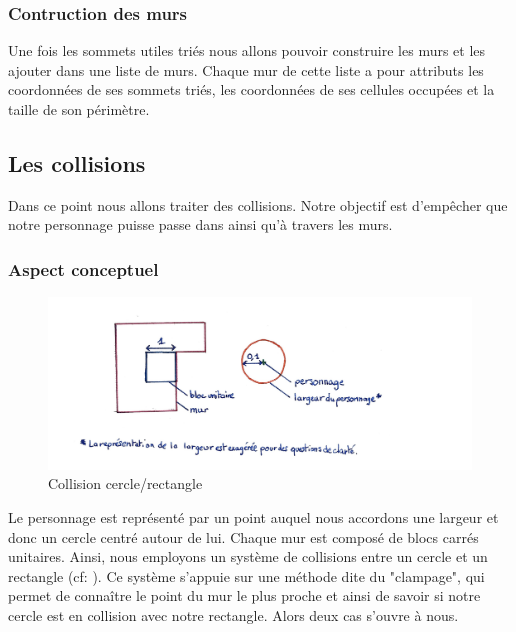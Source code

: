 \documentclass[11pt]{article}
\begin{document}
\subsubsection{Contruction des murs}
Une fois les sommets utiles triés nous allons pouvoir construire les murs et les ajouter dans une liste de murs. Chaque mur de cette liste a pour attributs les coordonnées de ses sommets triés, les coordonnées de ses cellules occupées et la taille de son périmètre.

\subsection{Les collisions}

Dans ce point nous allons traiter des collisions. Notre objectif est d'empêcher
que notre personnage puisse passe dans ainsi qu'à travers les murs.

\subsubsection{Aspect conceptuel}

\begin{figure}
	\centering
	\includegraphics[width=1\textwidth]{image/fig1.jpg}
	\caption{Collision cercle/rectangle}
	\label{fig:collision_cercle_rectangle}
\end{figure}

Le personnage est représenté par un point auquel nous accordons une 
largeur et donc un cercle centré autour de lui. Chaque mur est composé de 
blocs carrés unitaires. Ainsi, nous employons un système de collisions 
entre un cercle et un rectangle (cf: ). 
Ce système s'appuie sur une méthode dite du "clampage", qui permet de connaître le point du mur le plus proche 
et ainsi de savoir si notre cercle est en collision avec notre rectangle.
Alors deux cas s'ouvre à nous.
\end{document}

